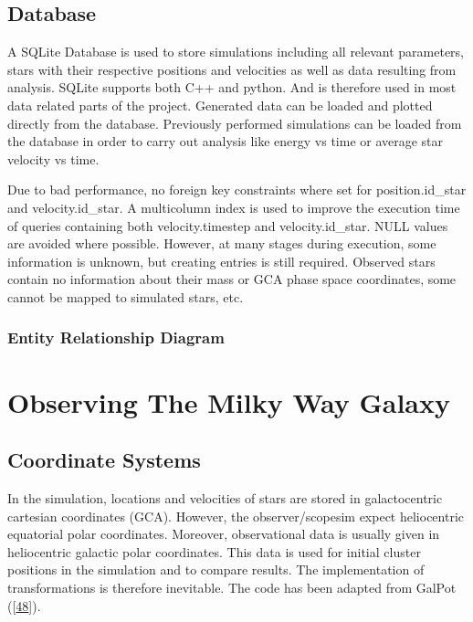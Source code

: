 \documentclass[letterpaper,10pt,english]{sphinxmanual}
\begin{document}
	\chapter{Database}
		\label{\detokenize{NBodySimulation/Database:database}}\label{\detokenize{NBodySimulation/Database::doc}}
		\sphinxAtStartPar
		A SQLite Database is used to store simulations including all relevant parameters, stars with their respective positions and velocities as well as data resulting from analysis.
		SQLite supports both C++ and python. And is therefore used in most data related parts of the project. Generated data can be loaded and plotted directly from the database.
		Previously performed simulations can be loaded from the database in order to carry out analysis like energy vs time or average star velocity vs time.
		
		\sphinxAtStartPar
		Due to bad performance, no foreign key constraints where set for position.id\_star and velocity.id\_star.
		A multi\sphinxhyphen{}column index is used to improve the execution time of queries containing both velocity.timestep and velocity.id\_star.
		NULL values are avoided where possible. However, at many stages during execution, some information is unknown, but creating entries is still required.
		Observed stars contain no information about their mass or GCA phase space coordinates, some cannot be mapped to simulated stars, etc.
		
		
		\section{Entity Relationship Diagram}
		\label{\detokenize{NBodySimulation/Database:entity-relationship-diagram}}
		\noindent{}

\part{Observing The Milky Way Galaxy}

\chapter{Coordinate Systems}
\label{\detokenize{NBodySimulation/CoordinateSystems:coordinate-systems}}\label{\detokenize{NBodySimulation/CoordinateSystems::doc}}
\sphinxAtStartPar
In the simulation, locations and velocities of stars are stored in galactocentric cartesian coordinates (GCA).
However, the observer/scopesim expect heliocentric equatorial polar coordinates.
Moreover, observational data is usually given in heliocentric galactic polar coordinates.
This data is used for initial cluster positions in the simulation and to compare results.
The implementation of transformations is therefore inevitable. The code has been adapted from GalPot ({[}\hyperlink{cite.NBodySimulation/Appendix:id23}{48}{]}).
\end{document}

